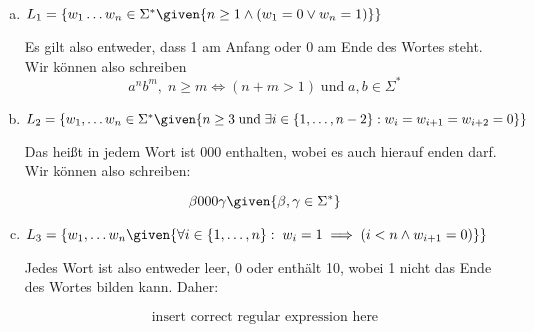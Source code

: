 \begin{enumerate}[a)]
\item $L_1 = \{ w_1 \ldots w_n \in \Sigma^{*} \given{n\geq 1 \land (w_1 = 0 \lor w_n = 1)} \} $

Es gilt also entweder, dass 1 am Anfang oder 0 am Ende des Wortes steht. Wir können also schreiben
\[  a^n b^m , \; n\geq m \iff (n+m > 1) \; \text{und} \; a,b \in \Sigma^{*}  \]

\item $L_2 = \{w_1, \ldots w_n \in \Sigma^{*} \given{n\geq 3 \; \text{und} \; \exists i \in \{ 1, \ldots, n-2 \} : w_i = w_{i+1} = w_{i+2} = 0 } \}$

Das heißt in jedem Wort ist 000 enthalten, wobei es auch hierauf enden darf. Wir können also schreiben:

\[ \beta 000 \gamma \given{\beta, \gamma \in \Sigma^{*} } \]

\item $ L_3 = \{ w_1, \ldots w_n \given{ \forall i \in \{1, \ldots, n\}: \; w_i = 1 \implies (i<n \land w_{i+1} = 0) } \} $

Jedes Wort ist also entweder leer, 0 oder enthält 10, wobei 1 nicht das Ende des Wortes bilden kann. Daher:

\[  \text{insert correct regular expression here}  \]

\end{enumerate}




